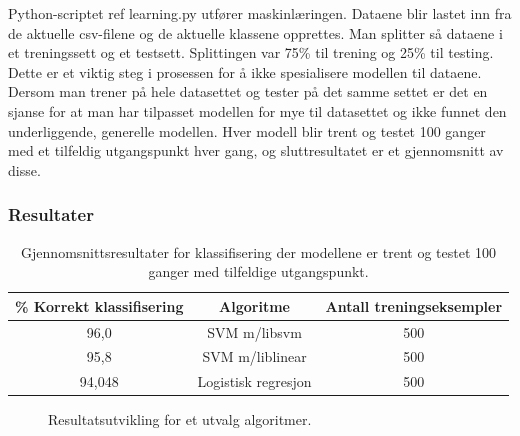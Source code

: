 Python-scriptet {\color{red} ref learning.py} utfører maskinlæringen. Dataene blir lastet inn fra de aktuelle csv-filene og de aktuelle klassene opprettes. Man splitter så dataene i et treningssett og et testsett. Splittingen var 75\% til trening og 25\% til testing. Dette er et viktig steg i prosessen for å ikke spesialisere modellen til dataene. Dersom man trener på hele datasettet og tester på det samme settet er det en sjanse for at man har tilpasset modellen for mye til datasettet og ikke funnet den underliggende, generelle modellen. Hver modell blir trent og testet 100 ganger med et tilfeldig utgangspunkt hver gang, og sluttresultatet er et gjennomsnitt av disse.

\subsubsection*{Resultater}
\label{ch:2.resultater}
\begin{table}[h!]
\centering
\begin{tabular}{|| c c c ||}
\hline
\% Korrekt klassifisering & Algoritme & Antall treningseksempler\\ [0.5ex] 
 \hline\hline
 96,0 & SVM m/libsvm & 500 \\ 
 \hline
 95,8 & SVM m/liblinear & 500 \\
 \hline
 94,048 & Logistisk regresjon & 500 \\ [1ex]
 \hline
\end{tabular}
\caption{Gjennomsnittsresultater for klassifisering der modellene er trent og testet 100 ganger med tilfeldige utgangspunkt.}
\label{table:results}
\end{table}

\begin{figure}[h!]
\centering
{}
\label{figure:resultsgraf}
\caption{Resultatsutvikling for et utvalg algoritmer.}
\end{figure}

